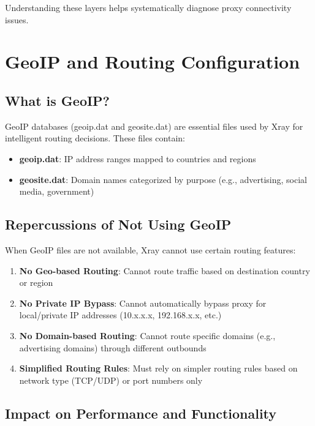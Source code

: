 Understanding these layers helps systematically diagnose proxy connectivity issues.

\section{GeoIP and Routing Configuration}

\subsection{What is GeoIP?}

GeoIP databases (geoip.dat and geosite.dat) are essential files used by Xray for intelligent routing decisions. These files contain:

\begin{itemize}
    \item \textbf{geoip.dat}: IP address ranges mapped to countries and regions
    \item \textbf{geosite.dat}: Domain names categorized by purpose (e.g., advertising, social media, government)
\end{itemize}

\subsection{Repercussions of Not Using GeoIP}

When GeoIP files are not available, Xray cannot use certain routing features:

\begin{enumerate}
    \item \textbf{No Geo-based Routing}: Cannot route traffic based on destination country or region
    \item \textbf{No Private IP Bypass}: Cannot automatically bypass proxy for local/private IP addresses (10.x.x.x, 192.168.x.x, etc.)
    \item \textbf{No Domain-based Routing}: Cannot route specific domains (e.g., advertising domains) through different outbounds
    \item \textbf{Simplified Routing Rules}: Must rely on simpler routing rules based on network type (TCP/UDP) or port numbers only
\end{enumerate}

\subsection{Impact on Performance and Functionality}


